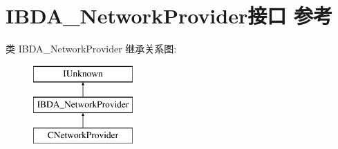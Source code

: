 \hypertarget{interface_i_b_d_a___network_provider}{}\section{I\+B\+D\+A\+\_\+\+Network\+Provider接口 参考}
\label{interface_i_b_d_a___network_provider}
类 I\+B\+D\+A\+\_\+\+Network\+Provider 继承关系图\+:\begin{figure}[H]
\begin{center}
\leavevmode
\includegraphics[height=3.000000cm]{interface_i_b_d_a___network_provider}
\end{center}
\end{figure}
